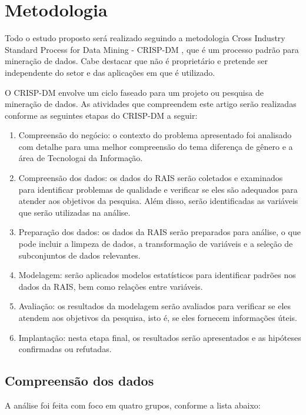 \section{Metodologia}

Todo o estudo proposto será realizado seguindo a metodologia Cross Industry Standard Process for Data Mining - CRISP-DM \cite{chapman2000crisp}, que é um processo padrão para mineração de dados.  Cabe destacar que não é proprietário e pretende ser independente do setor e das aplicações em que é utilizado.

O CRISP-DM envolve um ciclo faseado para um projeto ou pesquisa de mineração de dados. As atividades que compreendem este artigo serão realizadas conforme as seguintes etapas do CRISP-DM a seguir:

\begin{enumerate}
	\item Compreensão do negócio: o contexto do problema apresentado foi analisado com detalhe para uma melhor compreensão do tema diferença de gênero e a área de Tecnologai da Informação.
	\item Compreensão dos dados: os dados do RAIS serão coletados e examinados para identificar problemas de qualidade e verificar se eles são adequados para atender aos objetivos da pesquisa. Além disso, serão identificadas as variáveis que serão utilizadas na análise.
	\item Preparação dos dados: os dados da RAIS serão preparados para análise, o que pode incluir a limpeza de dados, a transformação de variáveis e a seleção de subconjuntos de dados relevantes. 
	\item Modelagem: serão aplicados modelos estatísticos para identificar padrões nos dados da RAIS, bem como relações entre variáveis.
	\item Avaliação: os resultados da modelagem serão avaliados para verificar se eles atendem aos objetivos da pesquisa, isto é, se eles fornecem informações úteis.
	\item Implantação: nesta etapa final, os resultados serão apresentados e as hipóteses confirmadas ou refutadas. 
\end{enumerate}
	      	      	      
\subsection{Compreensão dos dados}
	      	      	    
A análise foi feita com foco em quatro grupos, conforme a lista abaixo:

